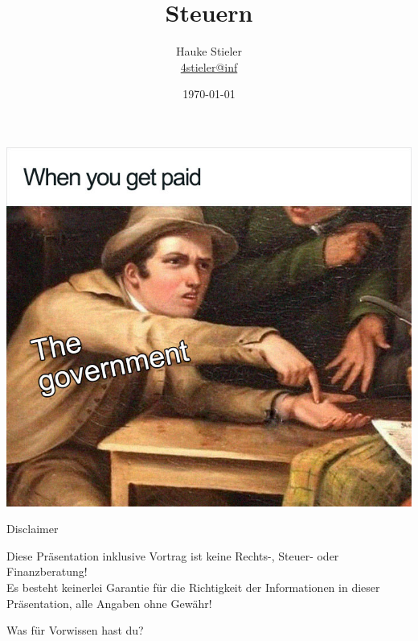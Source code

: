 \documentclass{beamer}
\author[Hauke Stieler]{Hauke Stieler\\\href{mailto:4stieler@informatik.uni-hamburg.de}{4stieler@inf}}
\title{Steuern}
\date{\today}
\newcommand{\n}{\hfill\\\vspace{0.25cm}}
\begin{document}
	{
		\begin{frame}
			\includegraphics[width=\paperwidth,trim=2cm 2cm -1.9cm 3.35cm]{images/tax-government}
		\end{frame}
		\addtocounter{page}{-1}
	}

	{
		\maketitle
		\addtocounter{page}{-1}
	}
	
	\begin{frame}{Disclaimer}
		\begin{center}
			Diese Präsentation inklusive Vortrag ist keine Rechts-, Steuer- oder Finanzberatung!\n
			Es besteht keinerlei Garantie für die Richtigkeit der Informationen in dieser Präsentation, alle Angaben ohne Gewähr!\n
		\end{center}
	\end{frame}

	\begin{frame}
		\begin{center}
			Was für Vorwissen hast du?
		\end{center}
	\end{frame}
\end{document}

